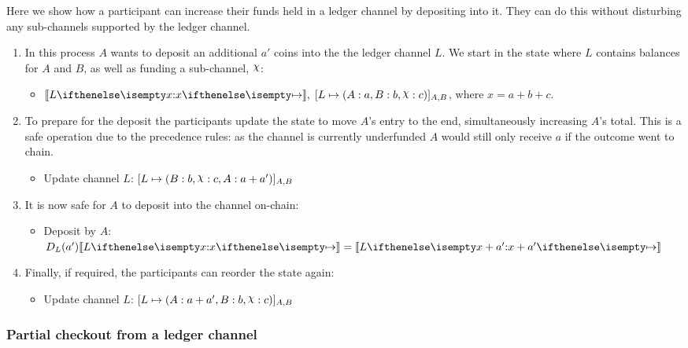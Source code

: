 \documentclass{article}
\begin{document}
Here we show how a participant can increase their funds held in a ledger channel by depositing into it.
They can do this without disturbing any sub-channels supported by the ledger channel.
\begin{enumerate}
  \item In this process $A$ wants to deposit an additional $a'$ coins into the the ledger channel $L$. We start in the state where $L$ contains balances for $A$ and $B$, as well as funding a sub-channel, $\rchi$:
  \begin{itemize}
    \item $\adj{\holds{L}{x}{}}, \; \finalizable{L}{\alloc{A: a, B: b, \rchi: c}}{A, B}$, where $x = a + b + c$.
  \end{itemize}
  \item To prepare for the deposit the participants update the state to move $A$'s entry to the end, simultaneously increasing $A$'s total. This is a safe operation due to the precedence rules: as the channel is currently underfunded $A$ would still only receive $a$ if the outcome went to chain.
  \begin{itemize}
    \item Update channel $L$: $\finalizable{L}{\alloc{B:b, \rchi: c, A: a + a'}}{A,B}$
  \end{itemize}
  \item It is now safe for $A$ to deposit into the channel on-chain:
  \begin{itemize}
    \item Deposit by $A$: $D_L(a')\adj{\holds{L}{x}{}} = \adj{\holds{L}{x + a'}{}}$
  \end{itemize}
  \item Finally, if required, the participants can reorder the state again:
  \begin{itemize}
    \item Update channel $L$: $\finalizable{L}{\alloc{ A: a + a', B: b, \rchi: c}}{A,B}$
  \end{itemize}
\end{enumerate}


\subsubsection{Partial checkout from a ledger channel}
\end{document}
